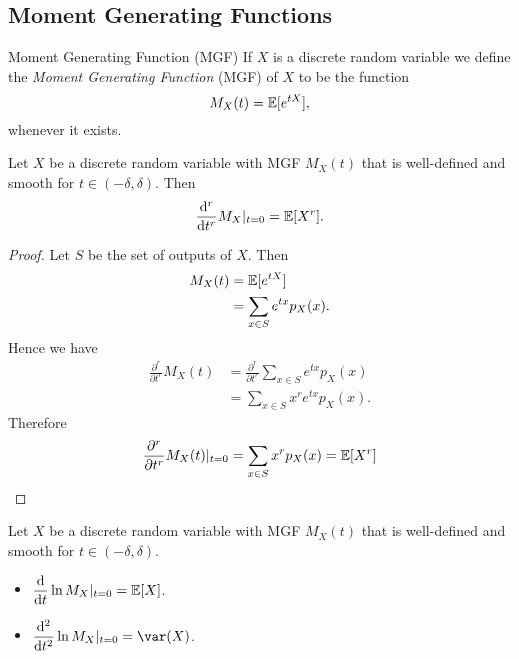 \documentclass[class=article, crop=false]{standalone}
\begin{document}
  \subsection{Moment Generating Functions}
  \begin{definition}{Moment Generating Function (MGF)}
    If $X$ is a discrete random variable we define the \emph{Moment Generating Function} (MGF) of $X$ to be the function
    \[
        M_X(t) = \mathbb{E}[e^{tX}],
    \]
    whenever it exists.
  \end{definition}
  \begin{theorem}{}
    Let $X$ be a discrete random variable with MGF $M_X(t)$ that is well-defined and smooth for $t\in (-\delta, \delta)$. Then
    \[
      \frac{\mathrm{d}^r}{\mathrm{d}t^r}M_X|_{t = 0} = \mathbb{E}[X^r].
    \]
    \begin{proof}
      Let $S$ be the set of outputs of $X$. Then
      \begin{align*}
        M_X(t) &= \mathbb{E}[e^{tX}] \\
               &= \sum_{x\in S}e^{tx}p_X(x).
      \end{align*}
      Hence we have
      \begin{align*}
        \frac{\partial^r}{\partial t^r} M_X(t) &= \frac{\partial^r}{\partial t^r}\sum_{x\in S}e^{tx}p_X(x) \\
                                                  &= \sum_{x\in S} x^re^{tx}p_X(x).
      \end{align*}
      Therefore
      \[
        \frac{\partial^r}{\partial t^r} M_X(t)|_{t = 0} = \sum_{x\in S}x^rp_X(x) = \mathbb{E}[X^r]
      \]
    \end{proof}
  \end{theorem}
  \begin{theorem}{}
    Let $X$ be a discrete random variable with MGF $M_X(t)$ that is well-defined and smooth for $t\in (-\delta, \delta)$.
    \begin{itemize}
      \item $\displaystyle \frac{\mathrm{d}}{\mathrm{d}t} \ln M_X|_{t = 0} = \mathbb{E}[X]$.
      \item $\displaystyle \frac{\mathrm{d}^2}{\mathrm{d}t^2} \ln M_X|_{t = 0} = \var(X)$.
    \end{itemize}
  \end{theorem}
\end{document}
